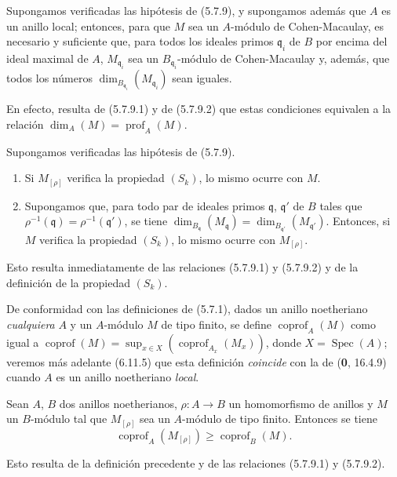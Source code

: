 \begin{corollary}[5.7.10]
\label{IV.2.s5.7.10-fr}
Supongamos verificadas las hipótesis de \textup{(5.7.9)}, y supongamos además que $A$
es un anillo local; entonces, para que $M$ sea un $A$-módulo de
Cohen-Macaulay, es necesario y suficiente que, para todos los ideales primos
$\mathfrak q_i$ de $B$ por encima del ideal maximal de $A$,
$M_{\mathfrak q_i}$ sea un $B_{\mathfrak q_i}$-módulo de Cohen-Macaulay y,
además, que todos los números
$\dim_{B_{\mathfrak q_i}}(M_{\mathfrak q_i})$ sean iguales.
\end{corollary}

En efecto, resulta de (5.7.9.1) y de (5.7.9.2) que estas condiciones
equivalen a la relación
$\dim_A(M)=\operatorname{prof}_A(M)$.

\begin{corollary}[5.7.11]
\label{IV.2.s5.7.11-fr}
Supongamos verificadas las hipótesis de \textup{(5.7.9)}.
\begin{enumerate}
\item[\textup{(i)}] Si $M_{[\rho]}$ verifica la propiedad $(S_k)$, lo mismo ocurre
con $M$.
\item[\textup{(ii)}] Supongamos que, para todo par de ideales primos
$\mathfrak q$, $\mathfrak q'$ de $B$ tales que
$\rho^{-1}(\mathfrak q)=\rho^{-1}(\mathfrak q')$, se tiene
$\dim_{B_{\mathfrak q}}(M_{\mathfrak q})
=\dim_{B_{\mathfrak q'}}(M_{\mathfrak q'})$. Entonces, si $M$ verifica la
propiedad $(S_k)$, lo mismo ocurre con $M_{[\rho]}$.
\end{enumerate}
\end{corollary}


Esto resulta inmediatamente de las relaciones (5.7.9.1) y (5.7.9.2) y de la
definición de la propiedad $(S_k)$.

\begin{env}[5.7.12]
\label{IV.2.s5.7.12-fr}
De conformidad con las definiciones de (5.7.1), dados un anillo noetheriano
\emph{cualquiera} $A$ y un $A$-módulo $M$ de tipo finito, se define
$\operatorname{coprof}_A(M)$ como igual a
$\operatorname{coprof}(M)=\sup_{x\in X}
(\operatorname{coprof}_{A_x}(M_x))$, donde $X=\operatorname{Spec}(A)$;
veremos más adelante (6.11.5) que esta definición \emph{coincide} con la de
(\textbf 0, 16.4.9) cuando $A$ es un anillo noetheriano \emph{local}.
\end{env}

\begin{corollary}[5.7.13]
\label{IV.2.s5.7.13-fr}
Sean $A$, $B$ dos anillos noetherianos, $\rho:A\to B$ un homomorfismo
de anillos y $M$ un $B$-módulo tal que $M_{[\rho]}$ sea un $A$-módulo de tipo
finito. Entonces se tiene
\begin{equation}
\operatorname{coprof}_A(M_{[\rho]})\geq\operatorname{coprof}_B(M).
\tag{5.7.13.1}\label{IV.2.s5.7.13.1-fr}
\end{equation}
\end{corollary}

Esto resulta de la definición precedente y de las relaciones (5.7.9.1) y
(5.7.9.2).
